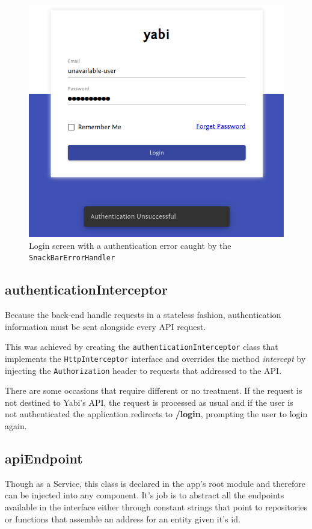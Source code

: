 \begin{figure}
  \centering
  \includegraphics[width=.7\textwidth]{images/screenshots/login-error}
  \caption{Login screen with a authentication error caught by the \texttt{SnackBarErrorHandler}}\label{fig:loginerror}
\end{figure}

\subsection{authenticationInterceptor}\label{f:auth}
Because the back-end handle requests in a stateless fashion, authentication information must be sent alongside every \gls{API} request.

This was achieved by creating the \texttt{authenticationInterceptor} class that implements the \texttt{HttpInterceptor} interface and overrides the method \textit{intercept} by injecting the \texttt{Authorization} header to requests that addressed to the \gls{API}.

There are some occasions that require different or no treatment. If the request is not destined to \gls{Yabi}'s \gls{API}, the request is processed as usual and if the user is not authenticated the application redirects to \textbf{/login}, prompting the user to login again.

\subsection{apiEndpoint}\label{f:endpoint}
Though as a Service, this class is declared in the app's root module and therefore can be injected into any component. It's job is to abstract all the endpoints available in the interface either through constant strings that point to repositories or functions that assemble an address for an entity given it's id.

